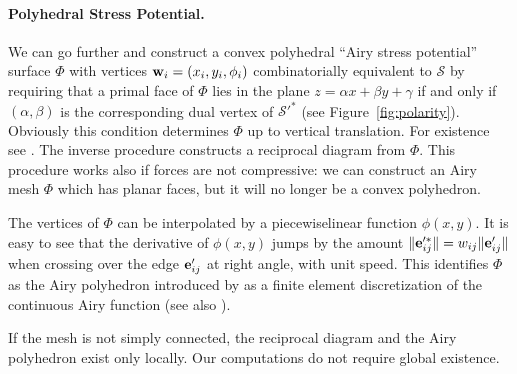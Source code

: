 \documentclass[review]{acmsiggraph}
\def\SS{{\mathcal S}}
\begin{document}
\paragraph{Polyhedral Stress Potential.}

We can go further and construct a convex polyhedral ``Airy stress 
potential'' surface $\Phi$ with vertices ${\mathbf w}_i=(x_i,y_i,\phi_i)$ 
combinatorially equivalent to $\SS$ by requiring that a primal face of 
$\Phi$ lies in the plane $z=\alpha x + \beta y + \gamma$ if and only if 
$(\alpha,\beta)$ is the corresponding dual vertex of $\SS'^*$ (see 
Figure~\ref{fig:polarity}). Obviously this condition determines $\Phi$ up 
to vertical translation. For existence see \cite{Ash1988}. The inverse 
procedure constructs a reciprocal diagram from $\Phi$. This procedure 
works also if forces are not compressive: we can construct an Airy mesh
$\Phi$ which has planar faces, but it will no longer be a convex 
polyhedron.

The vertices of $\Phi$ can be interpolated by a piecewise\dash linear 
function $\phi(x,y)$. It is easy to see that the derivative of $\phi(x,y)$ 
jumps by the amount $\|{\mathbf e}_{ij}'^*\| = w_{ij}\|{\mathbf e}_{ij}'\|$ when crossing 
over the edge ${\mathbf e}'_{ij}$ at right angle, with unit speed. This identifies 
$\Phi$ as the Airy polyhedron introduced by \cite{Fraternali2002a} as a 
finite element discretization of the continuous Airy function (see also 
\cite{Fraternali2010}).

If the mesh is not simply connected, the reciprocal diagram and the Airy 
polyhedron exist only locally. Our computations do not require global existence.
\end{document}
